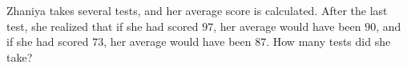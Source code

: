 Zhaniya takes several tests, and her average score is calculated. After the last test, she realized that if she had scored $97$, her average would have been $90$, and if she had scored $73$, her average would have been $87$. How many tests did she take?

